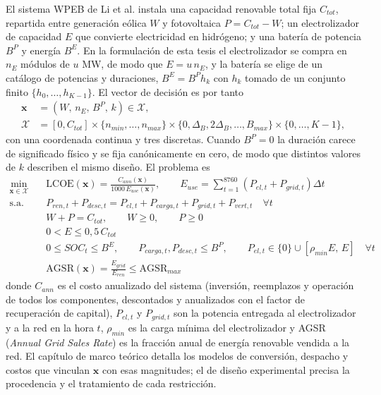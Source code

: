 El sistema WPEB de Li et al. \cite{Li2024WPEB} instala una capacidad renovable total fija $C_{tot}$, repartida entre generación eólica $W$ y fotovoltaica $P=C_{tot}-W$; un electrolizador de capacidad $E$ que convierte electricidad en hidrógeno; y una batería de potencia $B^P$ y energía $B^E$. En la formulación de esta tesis el electrolizador se compra en $n_E$ módulos de $u$ MW, de modo que $E=u\,n_E$, y la batería se elige de un catálogo de potencias y duraciones, $B^E=B^P h_k$ con $h_k$ tomado de un conjunto finito $\{h_0,\ldots,h_{K-1}\}$. El vector de decisión es por tanto
\begin{equation}
\begin{aligned}
\mathbf{x}&=(W,\,n_E,\,B^P,\,k)\in\mathcal{X},\\
\mathcal{X}&=[0,C_{tot}]\times\{n_{min},\ldots,n_{max}\}\times\{0,\Delta_B,2\Delta_B,\ldots,B_{max}\}\times\{0,\ldots,K-1\},
\end{aligned}
\label{eq:dominio}
\end{equation}
con una coordenada continua y tres discretas. Cuando $B^P=0$ la duración carece de significado físico y se fija canónicamente en cero, de modo que distintos valores de $k$ describen el mismo diseño. El problema es
\begin{align}
\min_{\mathbf{x}\in\mathcal{X}}\quad & \mathrm{LCOE}(\mathbf{x})=\frac{C_{ann}(\mathbf{x})}{1000\,E_{use}(\mathbf{x})},
\qquad E_{use}=\sum_{t=1}^{8760}\left(P_{el,t}+P_{grid,t}\right)\Delta t \label{eq:problema}\\
\text{s.a.}\quad & P_{ren,t}+P_{desc,t}=P_{el,t}+P_{carga,t}+P_{grid,t}+P_{vert,t} \quad\forall t \tag{C1}\\
& W+P=C_{tot},\qquad W\geq0,\qquad P\geq0 \tag{C2}\\
& 0<E\leq0{,}5\,C_{tot} \tag{C3}\\
& 0\leq SOC_t\leq B^E,\qquad P_{carga,t},P_{desc,t}\leq B^P,\qquad P_{el,t}\in\{0\}\cup[\rho_{min}E,\,E] \quad\forall t \tag{C4}\\
& \mathrm{AGSR}(\mathbf{x})=\frac{E_{grid}}{E_{ren}}\leq\mathrm{AGSR}_{max} \tag{C5}
\end{align}
donde $C_{ann}$ es el costo anualizado del sistema (inversión, reemplazos y operación de todos los componentes, descontados y anualizados con el factor de recuperación de capital), $P_{el,t}$ y $P_{grid,t}$ son la potencia entregada al electrolizador y a la red en la hora $t$, $\rho_{min}$ es la carga mínima del electrolizador y AGSR (\emph{Annual Grid Sales Rate}) es la fracción anual de energía renovable vendida a la red. El capítulo de marco teórico detalla los modelos de conversión, despacho y costos que vinculan $\mathbf{x}$ con esas magnitudes; el de diseño experimental precisa la procedencia y el tratamiento de cada restricción.

